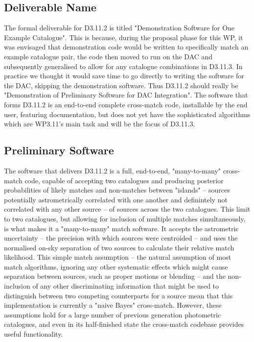 \documentclass[a4paper,11pt]{scrartcl}
\begin{document}
\subsection{Deliverable Name}
\label{sec:deliverable_name}
The formal deliverable for D3.11.2 is titled "Demonstration Software for One Example Catalogue".
This is because, during the proposal phase for this WP, it was envisaged that demonstration code would be written to specifically match an example catalogue pair, the code then moved to run on the DAC and subsequently generalised to allow for any catalogue combinations in D3.11.3.
In practice we thought it would save time to go directly to writing the software for the DAC, skipping the demonstration software.
Thus D3.11.2 should really be "Demonstration of Preliminary Software for DAC Integration".
The software that forms D3.11.2 is an end-to-end complete cross-match code, installable by the end user, featuring documentation, but does not yet have the sophisticated algorithms which are WP3.11’s main task and will be the focus of D3.11.3.


\subsection{Preliminary Software}
The software that delivers D3.11.2 is a full, end-to-end, "many-to-many" cross-match code, capable of accepting two catalogues and producing posterior probabilities of likely matches and non-matches between "islands" -- sources potentially astrometrically correlated with one another and definintely not correlated with any other source -- of sources across the two catalogues.
This limit to two catalogues, but allowing for inclusion of multiple matches simultaneously, is what makes it a "many-to-many" match software.
It accepts the astrometric uncertainty -- the precision with which sources were centroided -- and uses the normalised on-sky separation of two sources to calculate their relative match likelihood.
This simple match assumption -- the natural assumption of most match algorithms, ignoring any other systematic effects which might cause separation between sources, such as proper motions or blending -- and the non-inclusion of any other discriminating information that might be used to distinguish between two competing counterparts for a source mean that this implementation is currently a "naive Bayes" cross-match.
However, these assumptions hold for a large number of previous generation photometric catalogues, and even in its half-finished state the cross-match codebase provides useful functionality.
\end{document}
